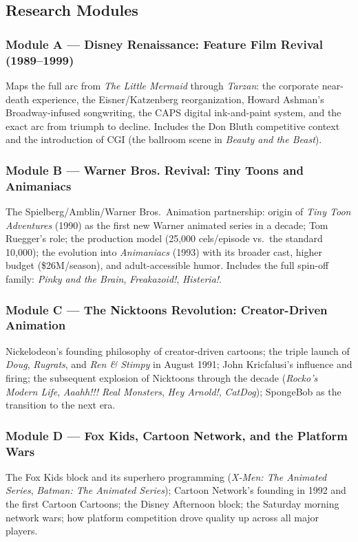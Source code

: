 \documentclass[11pt,letterpaper]{article}
\begin{document}
\subsection{Research Modules}

\subsubsection{Module A --- Disney Renaissance: Feature Film Revival (1989--1999)}
Maps the full arc from \textit{The Little Mermaid} through \textit{Tarzan}: the corporate near-death experience, the Eisner/Katzenberg reorganization, Howard Ashman's Broadway-infused songwriting, the CAPS digital ink-and-paint system, and the exact arc from triumph to decline. Includes the Don Bluth competitive context and the introduction of CGI (the ballroom scene in \textit{Beauty and the Beast}).

\subsubsection{Module B --- Warner Bros. Revival: Tiny Toons and Animaniacs}
The Spielberg/Amblin/Warner Bros.\ Animation partnership: origin of \textit{Tiny Toon Adventures} (1990) as the first new Warner animated series in a decade; Tom Ruegger's role; the production model (25,000 cels/episode vs.\ the standard 10,000); the evolution into \textit{Animaniacs} (1993) with its broader cast, higher budget (\$26M/season), and adult-accessible humor. Includes the full spin-off family: \textit{Pinky and the Brain}, \textit{Freakazoid!}, \textit{Histeria!}.

\subsubsection{Module C --- The Nicktoons Revolution: Creator-Driven Animation}
Nickelodeon's founding philosophy of creator-driven cartoons; the triple launch of \textit{Doug}, \textit{Rugrats}, and \textit{Ren \& Stimpy} in August 1991; John Kricfalusi's influence and firing; the subsequent explosion of Nicktoons through the decade (\textit{Rocko's Modern Life}, \textit{Aaahh!!! Real Monsters}, \textit{Hey Arnold!}, \textit{CatDog}); SpongeBob as the transition to the next era.

\subsubsection{Module D --- Fox Kids, Cartoon Network, and the Platform Wars}
The Fox Kids block and its superhero programming (\textit{X-Men: The Animated Series}, \textit{Batman: The Animated Series}); Cartoon Network's founding in 1992 and the first Cartoon Cartoons; the Disney Afternoon block; the Saturday morning network wars; how platform competition drove quality up across all major players.
\end{document}
